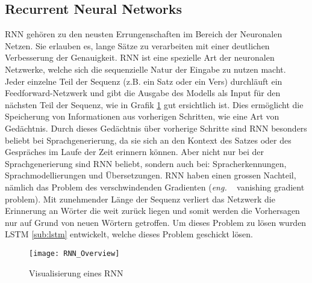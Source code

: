 \subsection{Recurrent Neural Networks}
\label{sub:rnn}
\gls{RNN} gehören zu den neusten Errungenschaften im Bereich der Neuronalen Netzen. Sie erlauben es, lange Sätze
zu verarbeiten mit einer deutlichen Verbesserung der Genauigkeit. \gls{RNN} ist eine spezielle Art der neuronalen
Netzwerke, welche sich die sequenzielle Natur der Eingabe zu nutzen macht. Jeder einzelne Teil der Sequenz (z.B. ein
Satz oder ein Vers) durchläuft ein Feedforward-Netzwerk und gibt die Ausgabe des Modells als Input für den nächsten Teil
der Sequenz, wie in Grafik \ref{fig:RNN-Overview} gut ersichtlich ist. Dies ermöglicht die Speicherung von Informationen aus
vorherigen Schritten, wie eine Art von Gedächtnis.
\newline
\newline
Durch dieses Gedächtnis über vorherige Schritte sind \gls{RNN} besonders beliebt bei Sprachgenerierung, da sie sich an den
Kontext des Satzes oder des Gespräches im Laufe der Zeit erinnern können. Aber nicht nur bei der Sprachgenerierung sind
\gls{RNN} beliebt, sondern auch bei: Spracherkennungen, Sprachmodellierungen und Übersetzungen.
\newline
\newline
\gls{RNN} haben einen grossen Nachteil, nämlich das Problem des verschwindenden Gradienten (\textit{eng.} \ \flqq
vanishing gradient problem\frqq). Mit zunehmender Länge der Sequenz verliert das Netzwerk die Erinnerung an Wörter die
weit zurück liegen und somit werden die Vorhersagen nur auf Grund von neuen Wörtern getroffen. Um dieses Problem zu
lösen wurden \gls{LSTM} \ref{sub:lstm} entwickelt, welche dieses Problem geschickt lösen.
\begin{figure}[H]
	\centering
	\texttt{[image: RNN\_Overview]}
	\caption{Visualisierung eines RNN}
	\label{fig:RNN-Overview}
\end{figure}

